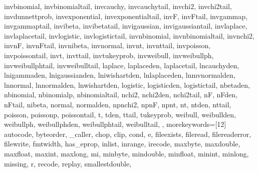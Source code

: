 {{        invbinomial, invbinomialtail, invcauchy, invcauchytail, invchi2, 
        invchi2tail, invdunnettprob, invexponential, invexponentialtail, 
        invF, invFtail, invgammap, invgammaptail, invibeta, invibetatail, 
        invigaussian, invigaussiantail, invlaplace, invlaplacetail, 
        invlogistic, invlogistictail, invnbinomial, invnbinomialtail, 
        invnchi2, invnF, invnFtail, invnibeta, invnormal, invnt, invnttail, 
        invpoisson, invpoissontail, invt, invttail, invtukeyprob, 
        invweibull, invweibullph, invweibullphtail, invweibulltail, laplace, 
        laplaceden, laplacetail, lncauchyden, lnigammaden, lnigaussianden, 
        lniwishartden, lnlaplaceden, lnmvnormalden, lnnormal, lnnormalden, 
        lnwishartden, logistic, logisticden, logistictail, nbetaden, 
        nbinomial, nbinomialp, nbinomialtail, nchi2, nchi2den, nchi2tail, 
        nF, nFden, nFtail, nibeta, normal, normalden, npnchi2, npnF, npnt, 
        nt, ntden, nttail, poisson, poissonp, poissontail, t, tden, ttail, 
        tukeyprob, weibull, weibullden, weibullph, weibullphden, 
        weibullphtail, weibulltail,
    },
    morekeywords=[12]{
        autocode, byteorder, _caller, chop, clip, cond, e, fileexists, 
        fileread, filereaderror, filewrite, fmtwidth, has_eprop, inlist, 
        inrange, irecode, maxbyte, maxdouble, maxfloat, maxint, maxlong, mi, 
        minbyte, mindouble, minfloat, minint, minlong, missing, r, recode, 
        replay, smallestdouble,
    }
}


\lstset{style=mystyle}